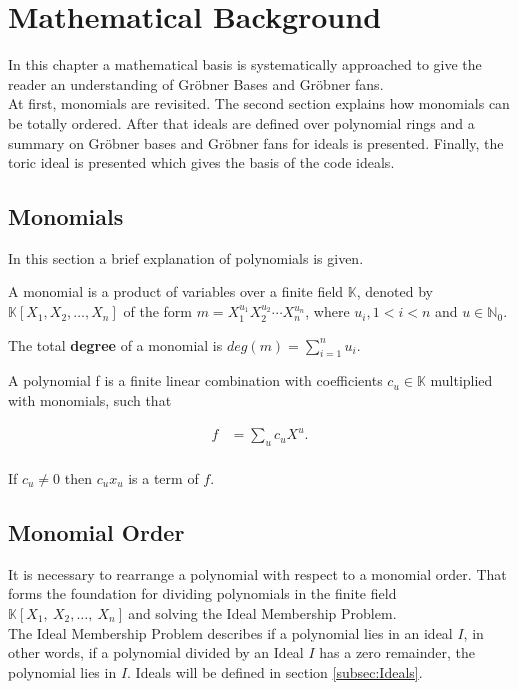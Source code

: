 \section{Mathematical Background}
\label{sec:background}

In this chapter a mathematical basis is systematically approached to give the reader an understanding of Gröbner Bases and Gröbner fans.\\
At first, monomials are revisited. The second section explains how monomials can be totally ordered.
After that ideals are defined over polynomial rings and a summary on Gröbner bases and Gröbner fans for ideals is presented. Finally, the toric ideal is presented which gives the basis of the code ideals.  

\subsection{Monomials}
\label{subseb:Monomials}

In this section a brief explanation of polynomials is given.

\begin{env_definition}[Monomial] 
\cite{KHZ}
A monomial is a product of variables over a finite field $\mathbb{K}$, denoted by $ \mathbb{K} \left[X_{1},X_{2},\dots, X_{n}\right]  $ of the form $m= X_{1}^{u_{1}}X_{2}^{u_{2}}\cdots X_{n}^{u_{n}}$, where $u_{i}, 1 < i < n $ and $u \in \mathbb{N}_{0}. $
\end{env_definition}
The total \textbf{degree} of a monomial is $deg(m) = \sum_{i=1}^n u_i $. 


\begin{env_definition}[Polynomial]
\cite{KHZ}
A polynomial f is a finite linear combination with coefficients $c_{u} \in \mathbb{K}$ multiplied with monomials, such that


\begin{align*}
	f &= \sum_{u} c_{u}X^{u}. \\
\end{align*}

\end{env_definition}
If $c_{u}\neq0$ then $c_{u}x_{u}$ is a term of $f$.

\newpage




\subsection{Monomial Order}
\label{subsec:Monomialorder}
It is necessary to rearrange a polynomial with respect to a monomial order. That forms the foundation for dividing polynomials in the finite field
$ \mathbb{K} \left[X_{1},~X_{2},\dots,~X_{n}\right]~$and solving the Ideal Membership Problem.\\
The Ideal Membership Problem describes if a polynomial lies in an ideal $I$, in other words, if a polynomial divided by an Ideal $I$ has a zero remainder, the polynomial lies in $I$. Ideals will be defined in section \ref{subsec:Ideals}.

